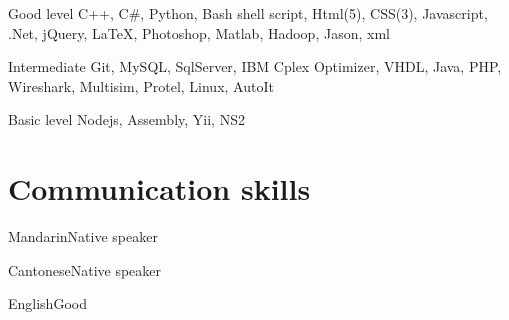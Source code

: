 \documentclass{tccv}
\begin{document}
\begin{factlist}

\item{Good level}
     {C++, C\#, Python, Bash shell script, Html(5), CSS(3), Javascript, .Net, jQuery, \LaTeX, Photoshop, Matlab, Hadoop, Jason, xml}

\item{Intermediate}
     {Git, MySQL, SqlServer, IBM Cplex Optimizer, VHDL, Java, PHP, Wireshark, Multisim, Protel, Linux, AutoIt}

\item{Basic level}
     {Nodejs, Assembly, Yii, NS2}

\end{factlist}









\section{Communication skills}

\begin{factlist}
\item{Mandarin}{Native speaker}
\item{Cantonese}{Native speaker}
\item{English}{Good}	
\end{factlist}
\end{document}
